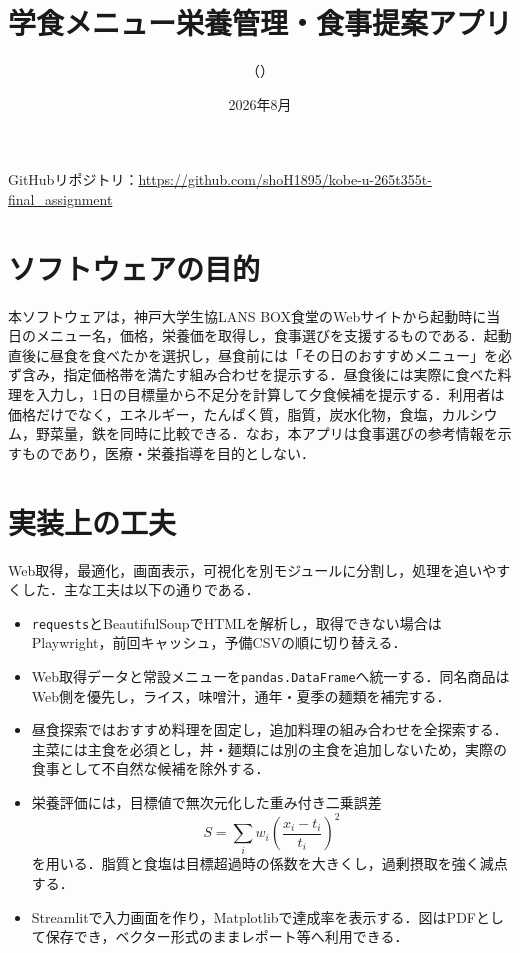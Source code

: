 \documentclass[10pt]{ltjsarticle}
\title{学食メニュー栄養管理・食事提案アプリ}
\author{\StudentName\quad（\StudentID）}
\date{2026年8月}
\newcommand{\RepositoryURL}{https://github.com/shoH1895/kobe-u-265t355t-final_assignment}
\begin{document}
\maketitle
\vspace{-2.0em}
\begin{center}
GitHubリポジトリ：\url{\RepositoryURL}
\end{center}
\vspace{-0.5em}

\section{ソフトウェアの目的}
本ソフトウェアは，神戸大学生協LANS BOX食堂のWebサイトから起動時に当日のメニュー名，価格，栄養価を取得し，食事選びを支援するものである．起動直後に昼食を食べたかを選択し，昼食前には「その日のおすすめメニュー」を必ず含み，指定価格帯を満たす組み合わせを提示する．昼食後には実際に食べた料理を入力し，1日の目標量から不足分を計算して夕食候補を提示する．利用者は価格だけでなく，エネルギー，たんぱく質，脂質，炭水化物，食塩，カルシウム，野菜量，鉄を同時に比較できる．なお，本アプリは食事選びの参考情報を示すものであり，医療・栄養指導を目的としない．

\section{実装上の工夫}
Web取得，最適化，画面表示，可視化を別モジュールに分割し，処理を追いやすくした．主な工夫は以下の通りである．
\begin{itemize}
  \item \texttt{requests}とBeautifulSoupでHTMLを解析し，取得できない場合はPlaywright，前回キャッシュ，予備CSVの順に切り替える．
  \item Web取得データと常設メニューを\texttt{pandas.DataFrame}へ統一する．同名商品はWeb側を優先し，ライス，味噌汁，通年・夏季の麺類を補完する．
  \item 昼食探索ではおすすめ料理を固定し，追加料理の組み合わせを全探索する．主菜には主食を必須とし，丼・麺類には別の主食を追加しないため，実際の食事として不自然な候補を除外する．
  \item 栄養評価には，目標値で無次元化した重み付き二乗誤差
  \[
    S=\sum_i w_i\left(\frac{x_i-t_i}{t_i}\right)^2
  \]
  を用いる．脂質と食塩は目標超過時の係数を大きくし，過剰摂取を強く減点する．
  \item Streamlitで入力画面を作り，Matplotlibで達成率を表示する．図はPDFとして保存でき，ベクター形式のままレポート等へ利用できる．
\end{itemize}
\end{document}

